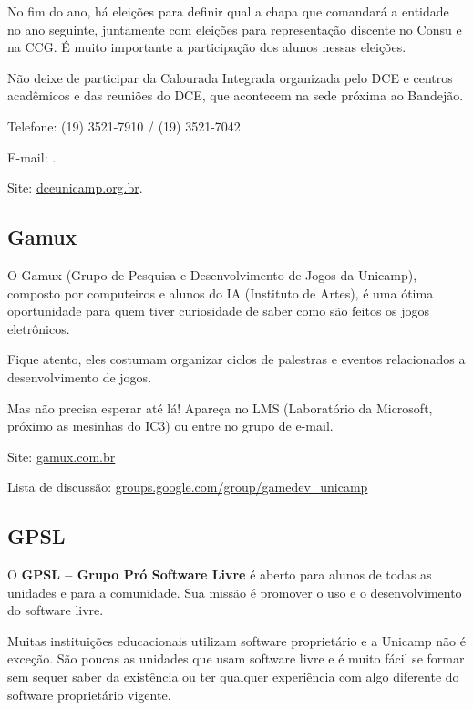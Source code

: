 No fim do ano, há eleições para definir qual
a chapa que comandará a entidade no ano seguinte, juntamente com eleições para
representação discente no Consu e na CCG. É muito importante a participação dos
alunos nessas eleições.

Não deixe de participar da Calourada Integrada organizada pelo DCE e centros
acadêmicos e das reuniões do DCE, que acontecem na sede próxima ao Bandejão.

\begin{compactitemize}
\item  Telefone: (19) 3521-7910 / (19) 3521-7042.
\item  E-mail: .
\item  Site: \url{dceunicamp.org.br}.
\end{compactitemize}

\subsection{Gamux}

O Gamux (Grupo de Pesquisa e Desenvolvimento de Jogos da Unicamp), composto por
computeiros e alunos do IA (Instituto de Artes), é uma ótima oportunidade para
quem tiver curiosidade de saber como são feitos os jogos eletrônicos.

Fique atento, eles costumam organizar ciclos de palestras e eventos relacionados
a desenvolvimento de jogos.

Mas não precisa esperar até lá! Apareça no LMS (Laboratório da Microsoft,
próximo as mesinhas do IC3) ou entre no grupo de e-mail.

\begin{compactitemize}
\item  Site: \url{gamux.com.br}
\item  Lista de discussão: \url{groups.google.com/group/gamedev_unicamp}
\end{compactitemize}

\subsection{GPSL}

O \textbf{GPSL -- Grupo Pró Software Livre} é aberto para alunos de todas as
unidades e para a comunidade. Sua missão é promover o uso e o desenvolvimento do
software livre.

Muitas instituições educacionais utilizam software proprietário e a Unicamp não
é exceção. São poucas as unidades que usam software livre e é muito fácil se
formar sem sequer saber da existência ou ter qualquer experiência com algo
diferente do software proprietário vigente.

